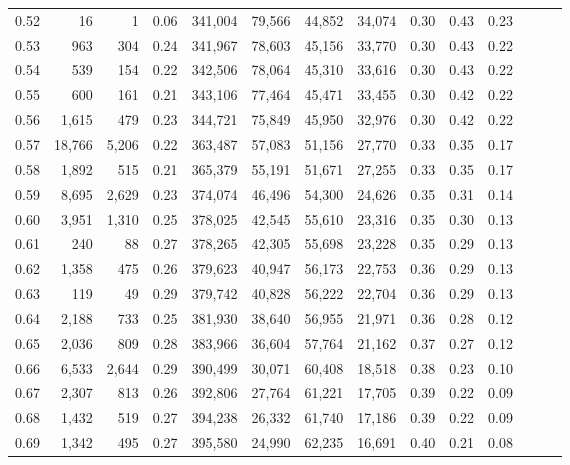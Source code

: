 \begin{tabular}{rrrrrrrrrrrrrr}
0.52 &      16 &      1 &  0.06 &  341,004 &   79,566 &  44,852 &  34,074 &  0.30 &  0.43 &      0.23 \\
0.53 &     963 &    304 &  0.24 &  341,967 &   78,603 &  45,156 &  33,770 &  0.30 &  0.43 &      0.22 \\
0.54 &     539 &    154 &  0.22 &  342,506 &   78,064 &  45,310 &  33,616 &  0.30 &  0.43 &      0.22 \\
0.55 &     600 &    161 &  0.21 &  343,106 &   77,464 &  45,471 &  33,455 &  0.30 &  0.42 &      0.22 \\
0.56 &   1,615 &    479 &  0.23 &  344,721 &   75,849 &  45,950 &  32,976 &  0.30 &  0.42 &      0.22 \\
0.57 &  18,766 &  5,206 &  0.22 &  363,487 &   57,083 &  51,156 &  27,770 &  0.33 &  0.35 &      0.17 \\
0.58 &   1,892 &    515 &  0.21 &  365,379 &   55,191 &  51,671 &  27,255 &  0.33 &  0.35 &      0.17 \\
0.59 &   8,695 &  2,629 &  0.23 &  374,074 &   46,496 &  54,300 &  24,626 &  0.35 &  0.31 &      0.14 \\
0.60 &   3,951 &  1,310 &  0.25 &  378,025 &   42,545 &  55,610 &  23,316 &  0.35 &  0.30 &      0.13 \\
0.61 &     240 &     88 &  0.27 &  378,265 &   42,305 &  55,698 &  23,228 &  0.35 &  0.29 &      0.13 \\
0.62 &   1,358 &    475 &  0.26 &  379,623 &   40,947 &  56,173 &  22,753 &  0.36 &  0.29 &      0.13 \\
0.63 &     119 &     49 &  0.29 &  379,742 &   40,828 &  56,222 &  22,704 &  0.36 &  0.29 &      0.13 \\
0.64 &   2,188 &    733 &  0.25 &  381,930 &   38,640 &  56,955 &  21,971 &  0.36 &  0.28 &      0.12 \\
0.65 &   2,036 &    809 &  0.28 &  383,966 &   36,604 &  57,764 &  21,162 &  0.37 &  0.27 &      0.12 \\
0.66 &   6,533 &  2,644 &  0.29 &  390,499 &   30,071 &  60,408 &  18,518 &  0.38 &  0.23 &      0.10 \\
0.67 &   2,307 &    813 &  0.26 &  392,806 &   27,764 &  61,221 &  17,705 &  0.39 &  0.22 &      0.09 \\
0.68 &   1,432 &    519 &  0.27 &  394,238 &   26,332 &  61,740 &  17,186 &  0.39 &  0.22 &      0.09 \\
0.69 &   1,342 &    495 &  0.27 &  395,580 &   24,990 &  62,235 &  16,691 &  0.40 &  0.21 &      0.08 \\

\end{tabular}
